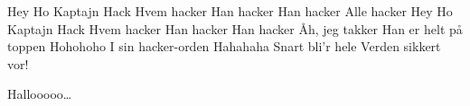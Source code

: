 \documentclass[a4paper,11pt]{article}
\begin{document}
\begin{song}
 Hey Ho Kaptajn Hack
 Hvem hacker
 Han hacker 
 Han hacker 
 Alle hacker
 Hey Ho Kaptajn Hack
 Hvem hacker
 Han hacker 
 Han hacker 
 Åh, jeg takker
 Han er helt på toppen
	Hohohoho
	I sin hacker-orden
	Hahahaha
	Snart bli'r hele Verden sikkert vor!


 Hallooooo\ldots

\end{song}
\end{document}
